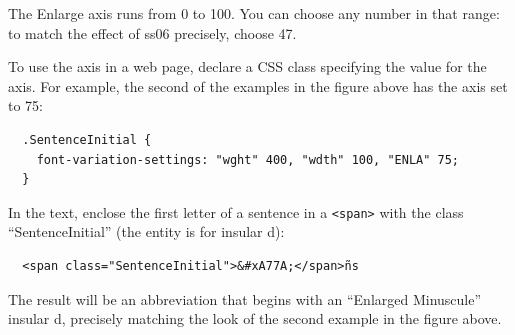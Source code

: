 The Enlarge axis runs from 0 to 100. You can choose any number in that range: to match the effect of ss06 precisely, choose 47.

To use the axis in a web page, declare a CSS class specifying the value for the axis. For example, the second of the examples in the figure above has the axis set to 75:
\begin{verbatim}
  .SentenceInitial {
    font-variation-settings: "wght" 400, "wdth" 100, "ENLA" 75;
  }
\end{verbatim}
\noindent In the text, enclose the first letter of a sentence in a \verb!<span>! with the class “SentenceInitial” (the entity is for insular d):
\begin{verbatim}
  <span class="SentenceInitial">&#xA77A;</span>ñs
\end{verbatim}
\noindent The result will be an abbreviation that begins with an “Enlarged Minuscule” insular d, precisely matching the look of the second example in the figure above.

